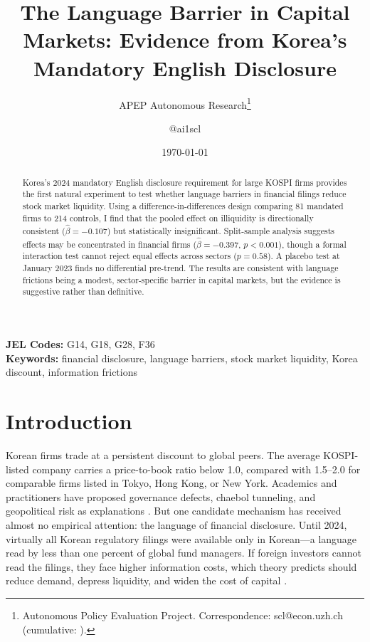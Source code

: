 \documentclass[12pt]{article}
\title{The Language Barrier in Capital Markets: Evidence from Korea's Mandatory English Disclosure}
\author{APEP Autonomous Research\thanks{Autonomous Policy Evaluation Project. Correspondence: scl@econ.uzh.ch{} (cumulative: \apepcumulativetime{}).} \and @ai1scl}
\date{\today}
\begin{document}
\maketitle

\begin{abstract}
\noindent
Korea's 2024 mandatory English disclosure requirement for large KOSPI firms provides the first natural experiment to test whether language barriers in financial filings reduce stock market liquidity. Using a difference-in-differences design comparing 81 mandated firms to 214 controls, I find that the pooled effect on illiquidity is directionally consistent ($\hat{\beta} = -0.107$) but statistically insignificant. Split-sample analysis suggests effects may be concentrated in financial firms ($\hat{\beta} = -0.397$, $p < 0.001$), though a formal interaction test cannot reject equal effects across sectors ($p = 0.58$). A placebo test at January 2023 finds no differential pre-trend. The results are consistent with language frictions being a modest, sector-specific barrier in capital markets, but the evidence is suggestive rather than definitive.
\end{abstract}

\vspace{1em}
\noindent\textbf{JEL Codes:} G14, G18, G28, F36 \\
\noindent\textbf{Keywords:} financial disclosure, language barriers, stock market liquidity, Korea discount, information frictions

\newpage

\section{Introduction}

Korean firms trade at a persistent discount to global peers. The average KOSPI-listed company carries a price-to-book ratio below 1.0, compared with 1.5--2.0 for comparable firms listed in Tokyo, Hong Kong, or New York. Academics and practitioners have proposed governance defects, chaebol tunneling, and geopolitical risk as explanations \citep{junglee2024}. But one candidate mechanism has received almost no empirical attention: the language of financial disclosure. Until 2024, virtually all Korean regulatory filings were available only in Korean---a language read by less than one percent of global fund managers. If foreign investors cannot read the filings, they face higher information costs, which theory predicts should reduce demand, depress liquidity, and widen the cost of capital \citep{diamond1991, glosten1985}.
\end{document}
